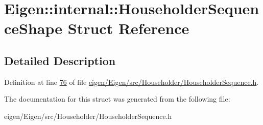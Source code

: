 \hypertarget{struct_eigen_1_1internal_1_1_householder_sequence_shape}{}\section{Eigen\+:\+:internal\+:\+:Householder\+Sequence\+Shape Struct Reference}
\label{struct_eigen_1_1internal_1_1_householder_sequence_shape}


\subsection{Detailed Description}


Definition at line \hyperlink{eigen_2_eigen_2src_2_householder_2_householder_sequence_8h_source_l00076}{76} of file \hyperlink{eigen_2_eigen_2src_2_householder_2_householder_sequence_8h_source}{eigen/\+Eigen/src/\+Householder/\+Householder\+Sequence.\+h}.



The documentation for this struct was generated from the following file\+:\begin{DoxyCompactItemize}
\item 
eigen/\+Eigen/src/\+Householder/\+Householder\+Sequence.\+h\end{DoxyCompactItemize}
